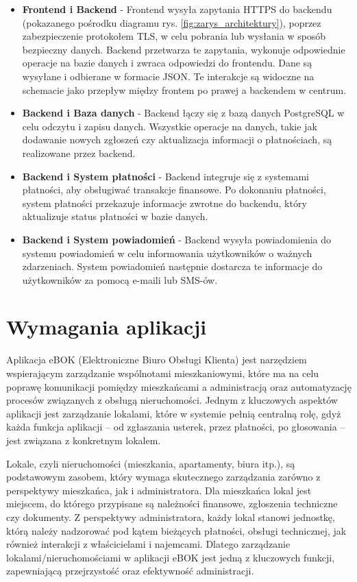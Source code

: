 \begin{itemize} 
	\item \textbf{Frontend i Backend} - Frontend wysyła zapytania HTTPS do backendu (pokazanego pośrodku diagramu rys. \ref{fig:zarys_architektury}), poprzez zabezpieczenie protokołem TLS, w celu pobrania lub wysłania w sposób bezpieczny danych. Backend przetwarza te zapytania, wykonuje odpowiednie operacje na bazie danych i zwraca odpowiedzi do frontendu. Dane są wysyłane i odbierane w formacie JSON. Te interakcje są widoczne na schemacie jako przepływ między frontem po prawej a backendem w centrum.
	
	\item \textbf{Backend i Baza danych} - Backend łączy się z bazą danych PostgreSQL w celu odczytu i zapisu danych. Wszystkie operacje na danych, takie jak dodawanie nowych zgłoszeń czy aktualizacja informacji o płatnościach, są realizowane przez backend.

	\item \textbf{Backend i System płatności} - Backend integruje się z systemami płatności, aby obsługiwać transakcje finansowe. Po dokonaniu płatności, system płatności przekazuje informacje zwrotne do backendu, który aktualizuje status płatności w bazie danych.

	\item \textbf{Backend i System powiadomień} - Backend wysyła powiadomienia do systemu powiadomień w celu informowania użytkowników o ważnych zdarzeniach. System powiadomień następnie dostarcza te informacje do użytkowników za pomocą e-maili lub SMS-ów.

\end{itemize}


\section{Wymagania aplikacji}

Aplikacja eBOK (Elektroniczne Biuro Obsługi Klienta) jest narzędziem wspierającym zarządzanie wspólnotami mieszkaniowymi, które ma na celu poprawę komunikacji pomiędzy mieszkańcami a administracją oraz automatyzację procesów związanych z obsługą nieruchomości. Jednym z kluczowych aspektów aplikacji jest zarządzanie lokalami, które w systemie pełnią centralną rolę, gdyż każda funkcja aplikacji – od zgłaszania usterek, przez płatności, po głosowania – jest związana z konkretnym lokalem.

Lokale, czyli nieruchomości (mieszkania, apartamenty, biura itp.), są podstawowym zasobem, który wymaga skutecznego zarządzania zarówno z perspektywy mieszkańca, jak i administratora. Dla mieszkańca lokal jest miejscem, do którego przypisane są należności finansowe, zgłoszenia techniczne czy dokumenty. Z perspektywy administratora, każdy lokal stanowi jednostkę, którą należy nadzorować pod kątem bieżących płatności, obsługi technicznej, jak również interakcji z właścicielami i najemcami. Dlatego zarządzanie lokalami/nieruchomościami w aplikacji eBOK jest jedną z kluczowych funkcji, zapewniającą przejrzystość oraz efektywność administracji.

